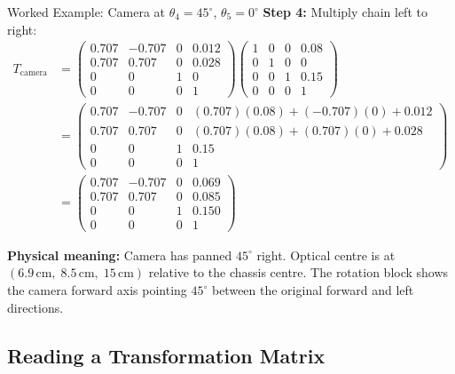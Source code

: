 \documentclass[12pt,a4paper]{article}
\begin{document}
\begin{mathbox}{Worked Example: Camera at $\theta_4 = 45^\circ$, $\theta_5 = 0^\circ$}
\textbf{Step 4:} Multiply chain left to right:
\begin{align*}
  T_{\text{camera}}
  &= \begin{pmatrix}0.707&-0.707&0&0.012\\0.707&0.707&0&0.028\\0&0&1&0\\0&0&0&1\end{pmatrix}
     \begin{pmatrix}1&0&0&0.08\\0&1&0&0\\0&0&1&0.15\\0&0&0&1\end{pmatrix} \\[8pt]
  &= \begin{pmatrix}
       0.707 & -0.707 & 0 & (0.707)(0.08)+(-0.707)(0)+0.012 \\
       0.707 &  0.707 & 0 & (0.707)(0.08)+(0.707)(0)+0.028  \\
       0     &  0     & 1 & 0.15 \\
       0     &  0     & 0 & 1
     \end{pmatrix} \\[8pt]
  &= \begin{pmatrix}
       0.707 & -0.707 & 0 & 0.069 \\
       0.707 &  0.707 & 0 & 0.085 \\
       0     &  0     & 1 & 0.150 \\
       0     &  0     & 0 & 1
     \end{pmatrix}
\end{align*}

\textbf{Physical meaning:} Camera has panned $45^\circ$ right. Optical centre
is at $(6.9\,\text{cm},\;8.5\,\text{cm},\;15\,\text{cm})$ relative to the
chassis centre. The rotation block shows the camera forward axis pointing
$45^\circ$ between the original forward and left directions.
\end{mathbox}

\subsection{Reading a Transformation Matrix}
\end{document}
